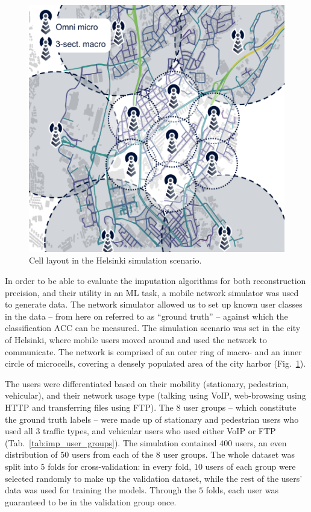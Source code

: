 				\begin{figure}[ht]
					\centering
					\includegraphics[width=0.6\linewidth]{figures/12_imputation/imp_sim_scenario/sim_scenario.pdf}
					\caption[Cell layout in the imputation simulation scenario]{Cell layout in the Helsinki simulation scenario.}
					\label{fig:imp_sim_scenario}
				\end{figure}
			
				In order to be able to evaluate the imputation algorithms for both reconstruction precision, and their utility in an \ac{ML} task, a mobile network simulator was used to generate data.			
				The network simulator allowed us to set up known user classes in the data -- from here on referred to as ``ground truth'' -- against which the classification \ac{ACC} can be measured.
				The simulation scenario was set in the city of Helsinki, where mobile users moved around and used the network to communicate.
				The network is comprised of an outer ring of macro- and an inner circle of microcells, covering a densely populated area of the city harbor (Fig.~\ref{fig:imp_sim_scenario}).
				
				The users were differentiated based on their mobility (stationary, pedestrian, vehicular), and their network usage type (talking using \ac{VoIP}, web-browsing using \ac{HTTP} and transferring files using \ac{FTP}).
				The $8$ user groups -- which constitute the ground truth labels -- were made up of stationary and pedestrian users who used all $3$ traffic types, and vehicular users who used either \ac{VoIP} or \ac{FTP} (Tab.~\ref{tab:imp_user_groups}).
				The simulation contained $400$ users, an even distribution of $50$ users from each of the $8$ user groups.
				The whole dataset was split into $5$ folds for cross-validation: in every fold, $10$ users of each group were selected randomly to make up the validation dataset, while the rest of the users' data was used for training the models.
				Through the $5$ folds, each user was guaranteed to be in the validation group once.
				
